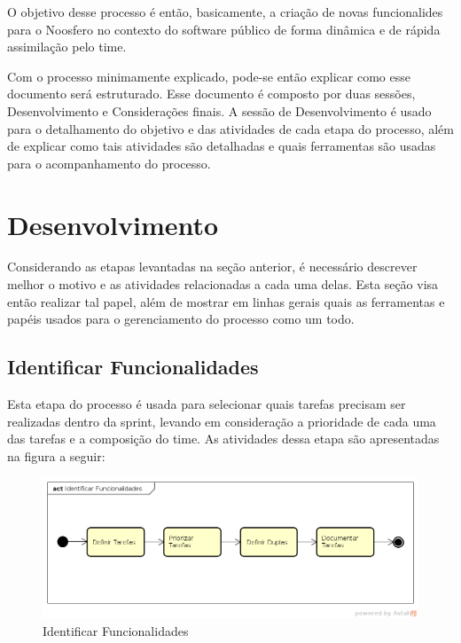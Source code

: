 \documentclass[a4paper, 11pt]{article}
\begin{document}
O objetivo desse processo é então, basicamente, a criação de novas
funcionalides para o Noosfero no contexto do software público de forma
dinâmica e de rápida assimilação pelo time.

Com o processo minimamente explicado, pode-se então explicar como esse
documento será estruturado. Esse documento é composto por duas sessões,
Desenvolvimento e Considerações finais. A sessão de Desenvolvimento é usado
para o detalhamento do objetivo e das atividades de cada etapa do processo,
além de explicar como tais atividades são detalhadas e quais ferramentas são
usadas para o acompanhamento do processo.


\section*{Desenvolvimento}

Considerando as etapas levantadas na seção anterior, é necessário descrever
melhor o motivo e as atividades relacionadas a cada uma delas. Esta seção visa
então realizar tal papel, além de mostrar em linhas gerais quais as
ferramentas e papéis usados para o gerenciamento do processo como um todo.

\subsection*{Identificar Funcionalidades}

Esta etapa do processo é usada para selecionar quais tarefas precisam ser
realizadas dentro da sprint, levando em consideração a prioridade de cada uma
das tarefas e a composição do time. As atividades dessa etapa são apresentadas
na figura a seguir:

\begin{figure}[ht!]
\centering
\includegraphics[width=150mm]{ident_func.png}
\caption{Identificar Funcionalidades\label{overflow}}
\end{figure}

\pagebreak
\end{document}
